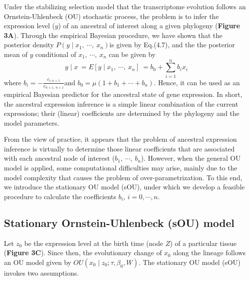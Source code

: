 \documentclass[]{book}
\begin{document}
Under the stabilizing selection model that the transcriptome evolution follows an Ornstein-Uhlenbeck (OU) stochastic process, the problem is to infer the expression level (\(y\)) of an ancestral of interest along a given phylogeny (\textbf{Figure 3A}). Through the empirical Bayesian procedure, we have shown that the posterior density \(P\left(y\mid x_1,\  \cdots,\  x_n\right)\)is given by Eq.(4.7), and the the posterior mean of \(y\) conditional of \(x_1,\  \cdots,\  x_n\) can be given by
\[y\mid x\  =E\left[y\mid x_1,\  \cdots,\  x_n\right]\  =b_0+\sum_{i=1}^nb_ix_i\tag{4.8}\]
where \(b_i=-\frac{c_{i,n+1}}{c_{n+1,\  n+1}}\)and \(b_0=\mu\left(1+b_1+\cdots+b_n\right)\). Hence, it can be used as an empirical Bayesian predictor for the ancestral state of gene expression. In short, the ancestral expression inference is a simple linear combination of the current expressions; their (linear) coefficients are determined by the phylogeny and the model parameters.

From the view of practice, it appears that the problem of ancestral expression inference is virtually to determine those linear coefficients that are associated with each ancestral node of interest (\(b_1,\  \cdots,\  b_n\)). However, when the general OU model is applied, some computational difficulties may arise, mainly due to the model complexity that causes the problem of over-parametrization. To this end, we introduce the stationary OU model (sOU), under which we develop a feasible procedure to calculate the coefficients \(b_i\), \(i=0,\cdots,n\).

\hypertarget{stationary-ornstein-uhlenbeck-sou-model}{%
\subsection{Stationary Ornstein-Uhlenbeck (sOU) model}\label{stationary-ornstein-uhlenbeck-sou-model}}

Let \(z_0\) be the expression level at the birth time (node \(Z\)) of a particular tissue (\textbf{Figure 3C}). Since then, the evolutionary change of \(x_0\) along the lineage follows an OU model given by \(OU\left(x_0\mid z_0; \tau,\beta_0, W\right)\). The stationary OU model (sOU) invokes two assumptions.
\end{document}

